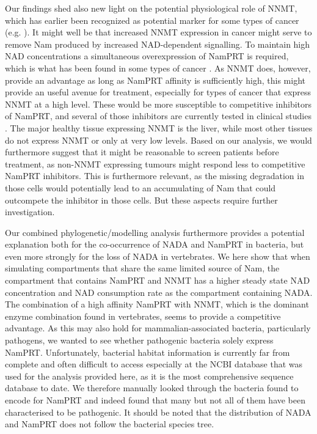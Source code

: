 Our findings shed also new light on the potential physiological role of NNMT, which has earlier been recognized as potential marker for some types of cancer (e.g. \cite{Okamura1998}). It might well be that increased NNMT expression in cancer might serve to remove Nam produced by increased NAD-dependent signalling. To maintain high NAD concentrations a simultaneous overexpression of NamPRT is required, which is what has been found in some types of cancer \cite{Bi2011,Wang2011}. As NNMT does, however, provide an advantage as long as NamPRT affinity is sufficiently high, this might provide an useful avenue for treatment, especially for types of cancer that express NNMT at a high level. These would be more susceptible to competitive inhibitors of NamPRT, and several of those inhibitors are currently tested in clinical studies . The major healthy tissue expressing NNMT is the liver, while most other tissues do not express NNMT or only at very low levels. Based on our analysis, we would furthermore suggest that it might be reasonable to screen patients before treatment, as non-NNMT expressing tumours might respond less to competitive NamPRT inhibitors. This is furthermore relevant, as the missing degradation in those cells would potentially lead to an accumulating of Nam that could outcompete the inhibitor in those cells. But these aspects require further investigation.

Our combined phylogenetic/modelling analysis furthermore provides a potential explanation both for the co-occurrence of NADA and NamPRT in bacteria, but even more strongly for the loss of NADA in vertebrates. We here show that when simulating compartments that share the same limited source of Nam, the compartment that contains NamPRT and NNMT has a higher steady state NAD concentration and NAD consumption rate as the compartment containing NADA. The combination of a high affinity NamPRT with NNMT, which is the dominant enzyme combination found in vertebrates, seems to provide a competitive advantage. As this may also hold for mammalian-associated bacteria, particularly pathogens, we wanted to see whether pathogenic bacteria solely express NamPRT. Unfortunately, bacterial habitat information is currently far from complete and often difficult to access especially at the NCBI database that was used for the analysis provided here, as it is the most comprehensive sequence database to date. We therefore manually looked through the bacteria found to encode for NamPRT and indeed found that many but not all of them have been characterised to be pathogenic. It should be noted that the distribution of NADA and NamPRT does not follow the bacterial species tree.


